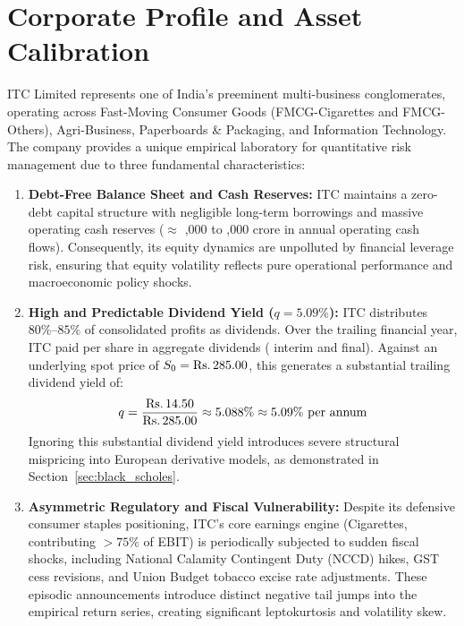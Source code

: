 
\section{Corporate Profile and Asset Calibration}
\label{sec:corporate_profile}

ITC Limited represents one of India's preeminent multi-business conglomerates, operating across Fast-Moving Consumer Goods (FMCG-Cigarettes and FMCG-Others), Agri-Business, Paperboards \& Packaging, and Information Technology. The company provides a unique empirical laboratory for quantitative risk management due to three fundamental characteristics:

\begin{enumerate}[leftmargin=1.8em, noitemsep]
    \item \textbf{Debt-Free Balance Sheet and Cash Reserves:} ITC maintains a zero-debt capital structure with negligible long-term borrowings and massive operating cash reserves ($\approx$ ,000 to ,000 crore in annual operating cash flows). Consequently, its equity dynamics are unpolluted by financial leverage risk, ensuring that equity volatility reflects pure operational performance and macroeconomic policy shocks.
    \item \textbf{High and Predictable Dividend Yield ($q = 5.09\%$):} ITC distributes $80\%\text{--}85\%$ of consolidated profits as dividends. Over the trailing financial year, ITC paid  per share in aggregate dividends ( interim and  final). Against an underlying spot price of $S_0 = \text{\text{Rs.}\,}285.00$, this generates a substantial trailing dividend yield of:
    \begin{equation}
    q = \frac{\text{\text{Rs.}\,}14.50}{\text{\text{Rs.}\,}285.00} \approx 5.088\% \approx 5.09\% \text{ per annum}
    \end{equation}
    Ignoring this substantial dividend yield introduces severe structural mispricing into European derivative models, as demonstrated in Section~\ref{sec:black_scholes}.
    \item \textbf{Asymmetric Regulatory and Fiscal Vulnerability:} Despite its defensive consumer staples positioning, ITC's core earnings engine (Cigarettes, contributing $>75\%$ of EBIT) is periodically subjected to sudden fiscal shocks, including National Calamity Contingent Duty (NCCD) hikes, GST cess revisions, and Union Budget tobacco excise rate adjustments. These episodic announcements introduce distinct negative tail jumps into the empirical return series, creating significant leptokurtosis and volatility skew.
\end{enumerate}

